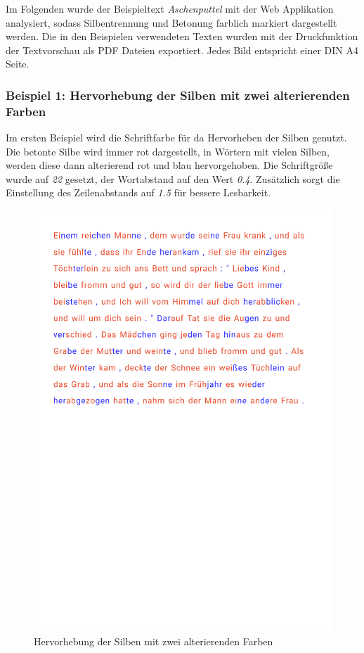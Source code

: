 Im Folgenden wurde der Beispieltext \textit{Aschenputtel} mit der Web Applikation analysiert, sodass Silbentrennung und Betonung farblich markiert dargestellt werden. Die in den Beispielen verwendeten Texten wurden mit der Druckfunktion der Textvorschau als PDF Dateien exportiert. Jedes Bild entspricht einer DIN A4 Seite.

\subsubsection{Beispiel 1: Hervorhebung der Silben mit zwei alterierenden Farben}

Im ersten Beispiel wird die Schriftfarbe für da Hervorheben der Silben genutzt. Die betonte Silbe wird immer rot dargestellt, in Wörtern mit vielen Silben, werden diese dann alterierend rot und blau hervorgehoben. Die Schriftgröße wurde auf \textit{22} gesetzt, der Wortabstand auf den Wert \textit{0.4}. Zusätzlich sorgt die Einstellung des Zeilenabstands auf \textit{1.5} für bessere Lesbarkeit.

\begin{figure}[h!]
	\centering
	\includegraphics[width=.7\linewidth, frame]{figures/evaluation/annotation1}
	\caption{Hervorhebung der Silben mit zwei alterierenden Farben}
	\label{fig:evaluation-ex1}
\end{figure}
\newpage

